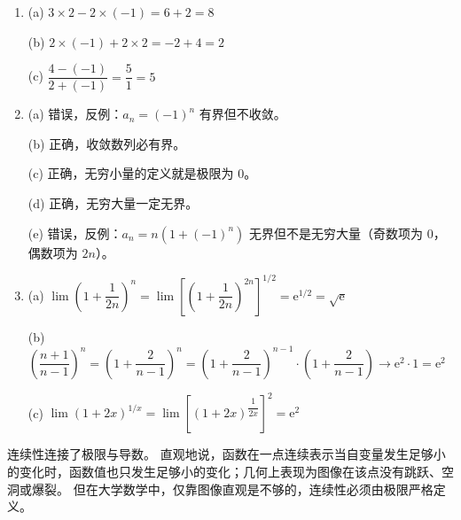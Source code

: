 \documentclass[fontset=fandol]{ctexart}
\newcommand{\ee}{\mathrm{e}}
\begin{document}
\begin{enumerate}
   \textbf{错误原因：} 等价无穷小替换在加减法中不能直接使用。\(\tan x\) 和 \(\sin x\) 的主要项相同，相减后主要项发生抵消。

   

   \textbf{正确解法：}

   \[

   \frac{\tan x-\sin x}{x^3}

   =\frac{\sin x}{x}\cdot\frac{1-\cos x}{x^2}\cdot\frac1{\cos x}

   \longrightarrow 1\cdot\frac12\cdot1=\frac12.

   \]



\item[8.] 

   (a) \(3 \times 2 - 2 \times (-1) = 6 + 2 = 8\) \quad

   (b) \(2 \times (-1) + 2 \times 2 = -2 + 4 = 2\) \quad

   (c) \(\dfrac{4 - (-1)}{2 + (-1)} = \dfrac{5}{1} = 5\)



\item[9.] 

   (a) 错误，反例：\(a_n = (-1)^n\) 有界但不收敛。\quad

   (b) 正确，收敛数列必有界。\quad

   (c) 正确，无穷小量的定义就是极限为 0。\quad

   (d) 正确，无穷大量一定无界。\quad

   (e) 错误，反例：\(a_n = n(1+(-1)^n)\) 无界但不是无穷大量（奇数项为 0，偶数项为 \(2n\)）。



\item[10.] 

(a) \(\lim\left(1+\dfrac{1}{2n}\right)^n = \lim\left[\left(1+\dfrac{1}{2n}\right)^{2n}\right]^{1/2} = \ee^{1/2} = \sqrt{\ee}\) \quad

   (b) \(\left(\dfrac{n+1}{n-1}\right)^n = \left(1 + \dfrac{2}{n-1}\right)^n = \left(1 + \dfrac{2}{n-1}\right)^{n-1} \cdot \left(1 + \dfrac{2}{n-1}\right) \to \ee^2 \cdot 1 = \ee^2\) \quad

   (c) \(\lim (1+2x)^{1/x} = \lim \left[(1+2x)^{\dfrac{1}{2x}}\right]^2 = \ee^2\)

\end{enumerate}



连续性连接了极限与导数。 直观地说，函数在一点连续表示当自变量发生足够小的变化时，函数值也只发生足够小的变化；几何上表现为图像在该点没有跳跃、空洞或爆裂。 但在大学数学中，仅靠图像直观是不够的，连续性必须由极限严格定义。
\end{document}
